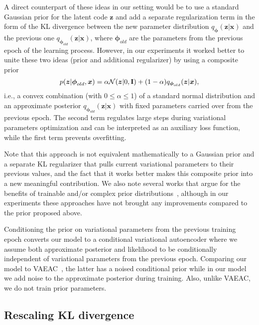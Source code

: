 \documentclass[sigconf,authorversion]{acmart}
\def\bz{{\bf z}}
\def\I{{\bf I}}
\def\bphi{{\boldsymbol{\phi}}}
\def\bz{\boldsymbol{z}}
\def\bx{\boldsymbol{x}}
\begin{document}
A direct counterpart of these ideas in our setting would be to use a standard Gaussian prior for the latent code $\bz$ and add a separate regularization term in the form of the KL divergence between the new parameter distribution $q_{\bphi}(\bz|\bx)$ and the previous one $q_{\bphi_{old}}(\bz|\bx)$, where $\bphi_{old}$ are the parameters from the previous epoch of the learning process. However, in our experiments it worked better to unite these two ideas (prior and additional regularizer) by using a composite prior
\begin{equation}\label{eq:composite_prior}
    p(\bz| \bphi_{old}, \bx ) = \alpha \mathcal{N}(\bz|0, \I) + (1-\alpha)q_{\bphi_{old}}(\bz|\bx),
\end{equation}
i.e., a convex combination (with $0 \leq \alpha \leq 1$) of a standard normal distribution and an approximate posterior $q_{\bphi_{old}}(\bz|\bx)$ with fixed parameters carried over from the previous epoch. The second term regulates large steps during variational parameters optimization and can be interpreted as an auxiliary loss function, while the first term prevents overfitting.

Note that this approach is not equivalent mathematically to a Gaussian prior and a separate KL regularizer that pulls current variational parameters to their previous values, and the fact that it works better makes this composite prior into a new meaningful contribution. We also note several works that argue for the benefits of trainable and/or complex prior distributions~\cite{tomczak2018vae,xu2019necessity}, although in our experiments these approaches have not brought any improvements compared to the prior proposed above.

Conditioning the prior on variational parameters from the previous training epoch converts our model to a conditional variational autoencoder where we assume both approximate posterior and likelihood to be conditionally independent of variational parameters from the previous epoch. Comparing our model to VAEAC~\cite{DBLP:conf/iclr/IvanovFV19}, the latter has a noised conditional prior while in our model we add noise to the approximate posterior during training. Also, unlike VAEAC, we do not train prior parameters.

\subsection{Rescaling KL divergence}\label{sec:kl}
\end{document}
